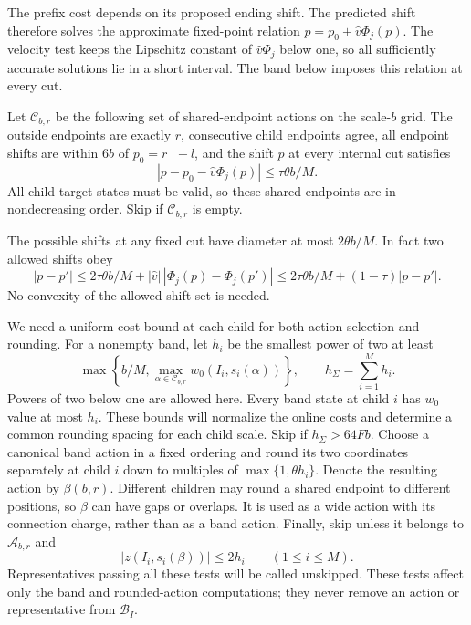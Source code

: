 The prefix cost depends on its proposed ending shift. The predicted
shift therefore solves the approximate fixed-point relation
$p=p_0+\widehat v\Phi_j(p)$. The velocity test keeps the Lipschitz
constant of $\widehat v\Phi_j$ below one, so all sufficiently accurate
solutions lie in a short interval. The band below imposes this relation
at every cut.

Let $\mathcal C_{b,r}$ be the following set of shared-endpoint actions
on the scale-$b$ grid.  The outside endpoints are exactly $r$,
consecutive child endpoints agree, all endpoint shifts are within
$6b$ of $p_0=r^--l$, and the shift $p$ at every internal cut satisfies
\begin{equation}\label{eq:band}
 |p-p_0-\widehat v\Phi_j(p)|\le\tau\theta b/M.
\end{equation}
All child target states must be valid, so these shared endpoints are in
nondecreasing order.  Skip if $\mathcal C_{b,r}$ is empty.

The possible shifts at any fixed cut have diameter at most
$2\theta b/M$.  In fact two allowed shifts obey
\[
 |p-p'|\le2\tau\theta b/M+
 |\widehat v|\,|\Phi_j(p)-\Phi_j(p')|
 \le2\tau\theta b/M+(1-\tau)|p-p'|.
\]
No convexity of the allowed shift set is needed.

We need a uniform cost bound at each child for both action selection and
rounding. For a nonempty band, let $h_i$ be the smallest power of two at least
\[
 \max\left\{b/M,\max_{\alpha\in\mathcal C_{b,r}}
                  w_0(I_i,s_i(\alpha))\right\},
 \qquad h_\Sigma=\sum_{i=1}^M h_i.
\]
Powers of two below one are allowed here. Every band state at child $i$
has $w_0$ value at most $h_i$. These bounds will normalize the online
costs and determine a common rounding spacing for each child scale.
Skip if $h_\Sigma>64Fb$.
Choose a canonical band action in a fixed ordering and round its two
coordinates separately at child $i$ down to multiples of
$\max\{1,\theta h_i\}$.  Denote the resulting action by
$\beta(b,r)$. Different children may round a shared endpoint to different
positions, so $\beta$ can have gaps or overlaps. It is used as a wide
action with its connection charge, rather than as a band action.
Finally, skip unless it belongs to $\mathcal A_{b,r}$
and
\begin{equation}\label{eq:rounded-guard}
 |z(I_i,s_i(\beta))|\le2h_i\qquad(1\le i\le M).
\end{equation}
Representatives passing all these tests will be called unskipped.
These tests affect only the band and rounded-action computations;
they never remove an action or representative from
$\mathcal B_I$.

